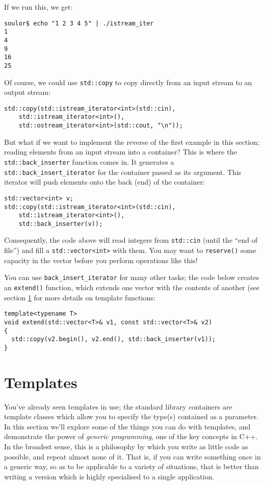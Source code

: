 \documentclass[a4paper]{scrartcl}
\begin{document}
If we run this, we get:
\begin{verbatim}
soulor$ echo "1 2 3 4 5" | ./istream_iter 
1
4
9
16
25
\end{verbatim}

Of course, we could use \verb|std::copy| to copy directly from an input stream to an output stream:
\begin{verbatim}
std::copy(std::istream_iterator<int>(std::cin),
    std::istream_iterator<int>(),
    std::ostream_iterator<int>(std::cout, "\n"));
\end{verbatim}

But what if we want to implement the reverse of the first example in this section; reading elements from an input stream into a container? This is where the \verb|std::back_inserter| function comes in. It generates a \verb|std::back_insert_iterator| for the container passed as its argument. This iterator will push elements onto the back (end) of the container:
\begin{verbatim}
std::vector<int> v;
std::copy(std::istream_iterator<int>(std::cin),
    std::istream_iterator<int>(),
    std::back_inserter(v));
\end{verbatim}

Consequently, the code above will read integers from \verb|std::cin| (until the ``end of file'') and fill a \verb|std::vector<int>| with them. You may want to \verb|reserve()| some capacity in the vector before you perform operations like this!

You can use \verb|back_insert_iterator| for many other tasks; the code below creates an \verb|extend()| function, which extends one vector with the contents of another (see section \ref{sec:templates} for more details on template functions:
\begin{verbatim}
template<typename T>
void extend(std::vector<T>& v1, const std::vector<T>& v2)
{
  std::copy(v2.begin(), v2.end(), std::back_inserter(v1));
}
\end{verbatim}


\section{Templates}\label{sec:templates}
You've already seen templates in use; the standard library containers are template classes which allow you to specify the type(s) contained as a parameter. In this section we'll explore some of the things you can do with templates, and demonstrate the power of \emph{generic programming}, one of the key concepts in C++. In the broadest sense, this is a philosophy by which you write as little code as possible, and repeat almost none of it. That is, if you can write something once in a generic way, so as to be applicable to a variety of situations, that is better than writing a version which is highly specialised to a single application.
\end{document}
